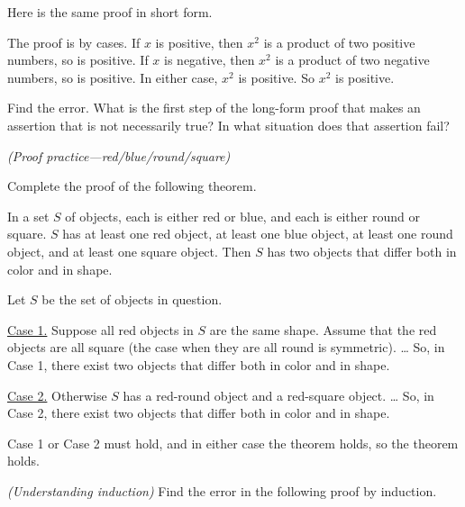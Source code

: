 Here is the same proof in short form.
\begin{shortFormProof}
  The proof is by cases.
  If $x$ is positive, then $x^2$ is a product of two positive numbers, so is positive.
  If $x$ is negative, then $x^2$ is a product of two negative numbers, so is positive.
  In either case, $x^2$ is positive.
  So $x^2$ is positive.
\end{shortFormProof}

Find the error.  What is the first step of the long-form proof that makes an assertion that is not necessarily true?
In what situation does that assertion fail?

\exercise \emph{(Proof practice---red/blue/round/square)}

Complete the proof of the following theorem.

\begin{theorem}
  In a set $S$ of objects, each is either red or blue, and each is either round or square. $S$ has at least one red object, at least one blue object, at least one round object, and at least one square object. Then $S$ has two objects that differ both in color and in shape.
\end{theorem}
\begin{longFormProof}
  \step Let $S$ be the set of objects in question.

  \begin{block}
    \step \underline{Case 1.} Suppose all red objects in $S$ are the same shape.
    \step Assume that the red objects are all square (the case when they are all round is symmetric).
    \step \ldots
    \step So, in Case 1, there exist two objects that differ both in color and in shape. 
  \end{block}
  
  \begin{block}
    \step \underline{Case 2.} Otherwise $S$ has a red-round object and a red-square object.
    \step \ldots
    \step So, in Case 2, there exist two objects that differ both in color and in shape.
  \end{block}
  
  \step Case 1 or Case 2 must hold, and in either case the theorem holds,
  so the theorem holds.
\end{longFormProof}


\exercise\label{proofs: exercise: understanding induction}\emph{(Understanding induction)} Find the error in the following proof by induction.

